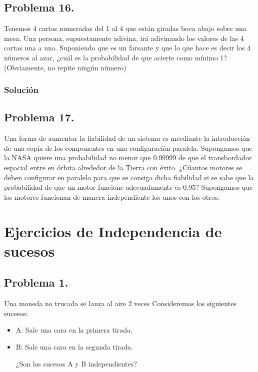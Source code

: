 \documentclass[
]{article}
\begin{document}
\hypertarget{problema-16.}{%
\subsection{Problema 16.}\label{problema-16.}}

Tenemos 4 cartas numeradas del 1 al 4 que están giradas boca abajo sobre
una mesa. Una persona, supuestamente adivina, irá adivinando los valores
de las 4 cartas una a una. Suponiendo que es un farsante y que lo que
hace es decir los 4 números al azar, ¿cuál es la probabilidad de que
acierte como mínimo 1? (Obviamente, no repite ningún número)

\hypertarget{soluciuxf3n-16}{%
\subsubsection{Solución}\label{soluciuxf3n-16}}

\hypertarget{problema-17.}{%
\subsection{Problema 17.}\label{problema-17.}}

Una forma de aumentar la fiabilidad de un sistema es meediante la
introducción de una copia de los componentes en una configuración
paralela. Supongamos que la NASA quiere una probabilidad no menor que
0.99999 de que el transbordador espacial entre en órbita alrededor de la
Tierra con éxito. ¿Cúantos motores se deben configurar en paralelo para
que se consiga dicha fiabilidad si se sabe que la probabilidad de que un
motor funcione adecuadamente es 0.95? Supongamos que los motores
funcionan de manera independiente los unos con los otros.

\hypertarget{ejercicios-de-independencia-de-sucesos}{%
\section{Ejercicios de Independencia de
sucesos}\label{ejercicios-de-independencia-de-sucesos}}

\hypertarget{problema-1.}{%
\subsection{Problema 1.}\label{problema-1.}}

Una moneda no trucada se lanza al aire 2 veces Consideremos los
siguientes sucesos:

\begin{itemize}
\item
  A: Sale una cara en la primera tirada.
\item
  B: Sale una cara en la segunda tirada.

  ¿Son los sucesos A y B independientes?
\end{itemize}
\end{document}
